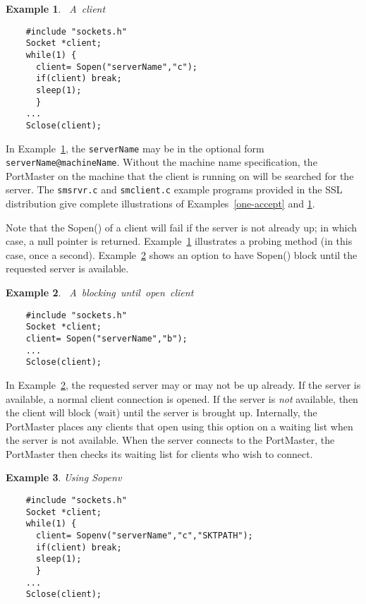 \documentclass[12pt]{article}
\def\SSL{{\small SSL}}
\newtheorem{example}{Example}[section]
\begin{document}
\begin{example}~A~client                    \\ \label{client}
 \begin{verbatim}
    #include "sockets.h"
    Socket *client;
    while(1) {
      client= Sopen("serverName","c");
      if(client) break;
      sleep(1);
      }
    ...
    Sclose(client);
 \end{verbatim}
\end{example}

In Example~\ref{client}, the \verb`serverName` may be in the optional form
\verb`serverName@machineName`.  Without the machine name specification, the
PortMaster on the machine that the client is running on will be searched for
the server.  The \verb`smsrvr.c` and \verb`smclient.c` example programs provided
in the {\SSL} distribution give complete illustrations of Examples~\ref{one-accept}
and \ref{client}.

Note that the Sopen() of a client will fail if the server is not already up; in
which case, a null pointer is returned.  Example~\ref{client} illustrates a
probing method (in this case, once a second).  Example~\ref{blockingclient}
shows an option to have Sopen() block until the requested server is available.

\begin{example}~A~blocking~until~open~client \\ \label{blockingclient}
 \begin{verbatim}
    #include "sockets.h"
    Socket *client;
    client= Sopen("serverName","b");
    ...
    Sclose(client);
 \end{verbatim}
\end{example}

In Example~\ref{blockingclient}, the requested server may or may not be up already.
If the server is available, a normal client connection is opened.  If the server
is {\it not} available, then the client will block (wait) until the server
is brought up.  Internally, the PortMaster places any clients that open using
this option on a waiting list when the server is not available.  When the server
connects to the PortMaster, the PortMaster then checks its waiting list for
clients who wish to connect.

\begin{example} Using Sopenv                                 \\ \label{using-sopenv}
 \begin{verbatim}
    #include "sockets.h"
    Socket *client;
    while(1) {
      client= Sopenv("serverName","c","SKTPATH");
      if(client) break;
      sleep(1);
      }
    ...
    Sclose(client);
 \end{verbatim}
\end{example}
\end{document}
